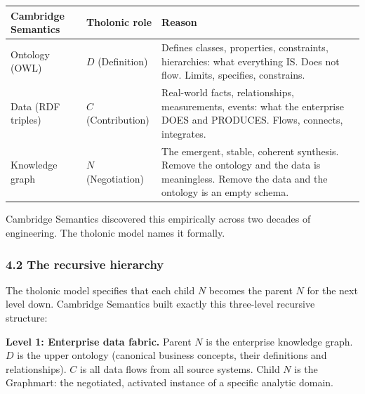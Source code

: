 \documentclass[
  11pt,
  letterpaper,
]{article}
\begin{document}
\begin{longtable}[]{@{}
  >{\raggedright\arraybackslash}p{}
  >{\raggedright\arraybackslash}p{}
  >{\raggedright\arraybackslash}p{}@{}}
\toprule\noalign{}
\begin{minipage}[b]{\linewidth}\raggedright
Cambridge Semantics
\end{minipage} & \begin{minipage}[b]{\linewidth}\raggedright
Tholonic role
\end{minipage} & \begin{minipage}[b]{\linewidth}\raggedright
Reason
\end{minipage} \\
\midrule\noalign{}
\endhead
\bottomrule\noalign{}
\endlastfoot
Ontology (OWL) & \(D\) (Definition) & Defines classes, properties,
constraints, hierarchies: what everything IS. Does not flow. Limits,
specifies, constrains. \\
Data (RDF triples) & \(C\) (Contribution) & Real-world facts,
relationships, measurements, events: what the enterprise DOES and
PRODUCES. Flows, connects, integrates. \\
Knowledge graph & \(N\) (Negotiation) & The emergent, stable, coherent
synthesis. Remove the ontology and the data is meaningless. Remove the
data and the ontology is an empty schema. \\
\end{longtable}

Cambridge Semantics discovered this empirically across two decades of
engineering. The tholonic model names it formally.

\subsubsection{4.2 The recursive
hierarchy}\label{the-recursive-hierarchy}

The tholonic model specifies that each child \(N\) becomes the parent
\(N\) for the next level down. Cambridge Semantics built exactly this
three-level recursive structure:

\textbf{Level 1: Enterprise data fabric.} Parent \(N\) is the enterprise
knowledge graph. \(D\) is the upper ontology (canonical business
concepts, their definitions and relationships). \(C\) is all data flows
from all source systems. Child \(N\) is the Graphmart: the negotiated,
activated instance of a specific analytic domain.
\end{document}
